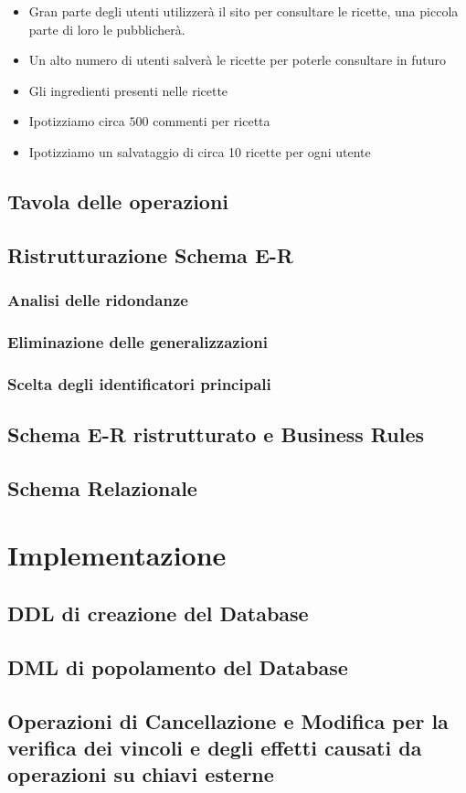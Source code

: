 \documentclass[12pt]{extarticle}
\begin{document}
\begin{itemize}
    \item Gran parte degli utenti utilizzerà il sito per consultare le ricette, una piccola parte di loro le pubblicherà.
    \item Un alto numero di utenti salverà le ricette per poterle consultare in futuro
    \item Gli ingredienti presenti nelle ricette
    \item Ipotizziamo circa $500$ commenti per ricetta
    \item Ipotizziamo un salvataggio di circa 10 ricette per ogni utente
\end{itemize}

\newpage

\subsection{Tavola delle operazioni}

\subsection{Ristrutturazione Schema E-R}
\subsubsection{Analisi delle ridondanze}
\subsubsection{Eliminazione delle generalizzazioni}
\subsubsection{Scelta degli identificatori principali}

\subsection{Schema E-R ristrutturato e Business Rules}

\subsection{Schema Relazionale}

\section{Implementazione}
\subsection{DDL di creazione del Database}

\subsection{DML di popolamento del Database}

\subsection{Operazioni di Cancellazione e Modifica per la verifica dei vincoli e degli effetti causati da operazioni su chiavi esterne}
\end{document}

